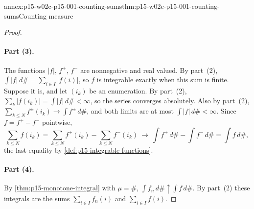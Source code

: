 \begin{annexitem}{annex:p15-w02c-p15-001-counting-sums}{thm:p15-w02c-p15-001-counting-sums}{Counting measure}
\begin{proof}
\paragraph{Part (3).}
The functions \(|f|\), \(f^+\), \(f^-\) are nonnegative and real valued.
By part~(2), \(\int|f|\,d\#=\sum_{i\in I}|f(i)|\), so \(f\) is integrable
exactly when this sum is finite. Suppose it is, and let \((i_k)\) be an
enumeration. By part~(2), \(\sum_k|f(i_k)|=\int|f|\,d\#<\infty\), so the
series converges absolutely. Also by part~(2),
\(\sum_{k\leq N}f^\pm(i_k)\to\int f^\pm\,d\#\), and both limits are at most
\(\int|f|\,d\#<\infty\). Since \(f=f^+-f^-\) pointwise,
\[
 \sum_{k\leq N}f(i_k)=\sum_{k\leq N}f^+(i_k)-\sum_{k\leq N}f^-(i_k)
 \ \to\ \int f^+\,d\#-\int f^-\,d\#=\int f\,d\#,
\]
the last equality by \cref{def:p15-integrable-functions}.

\paragraph{Part (4).}
By \cref{thm:p15-monotone-integral} with \(\mu=\#\),
\(\int f_n\,d\#\uparrow\int f\,d\#\). By part~(2) these integrals are the
sums \(\sum_{i\in I}f_n(i)\) and \(\sum_{i\in I}f(i)\).
\end{proof}
\end{annexitem}

